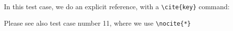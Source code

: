 \documentclass{article}
\begin{document}
\noindent In this test case, we do an  explicit reference, with a \verb+\cite{key}+ command: \cite{key}
\bigskip

\noindent
Please see also test case number 11, where we use \verb+\nocite{*}+

\printbibliography
\end{document}
